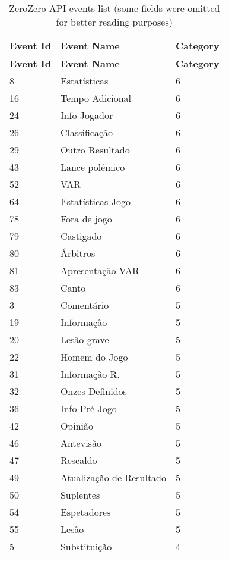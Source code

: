 \begin{longtable}{| p{} | p{} | p{} |} 
    \caption{ZeroZero API events list (some fields were omitted for better reading purposes)} \\
    \hline
    \textbf{Event Id} & \textbf{Event Name} & \textbf{Category} \\ \hline
    \endfirsthead       
    \hline    
    \textbf{Event Id} & \textbf{Event Name} & \textbf{Category} \\ \hline       
    \endhead      
    8 & Estatísticas & 6 \\ \hline
    16 & Tempo Adicional & 6 \\ \hline
    24 & Info Jogador & 6 \\ \hline
    26 & Classificação & 6 \\ \hline
    29 & Outro Resultado & 6 \\ \hline
    43 & Lance polémico & 6 \\ \hline
    52 & VAR & 6 \\ \hline
    64 & Estatísticas Jogo & 6 \\ \hline
    78 & Fora de jogo & 6 \\ \hline
    79 & Castigado & 6 \\ \hline
    80 & Árbitros & 6 \\ \hline
    81 & Apresentação VAR & 6 \\ \hline
    83 & Canto & 6 \\ \hline
    3 & Comentário & 5 \\ \hline
    19 & Informação & 5 \\ \hline
    20 & Lesão grave & 5 \\ \hline
    22 & Homem do Jogo & 5 \\ \hline
    31 & Informação R. & 5 \\ \hline
    32 & Onzes Definidos & 5 \\ \hline
    36 & Info Pré-Jogo & 5 \\ \hline
    42 & Opinião & 5 \\ \hline
    46 & Antevisão & 5 \\ \hline
    47 & Rescaldo & 5 \\ \hline
    49 & Atualização de Resultado & 5 \\ \hline
    50 & Suplentes & 5 \\ \hline
    54 & Espetadores & 5 \\ \hline
    55 & Lesão & 5 \\ \hline
    5 & Substituição & 4 \\ \hline

\end{longtable}
